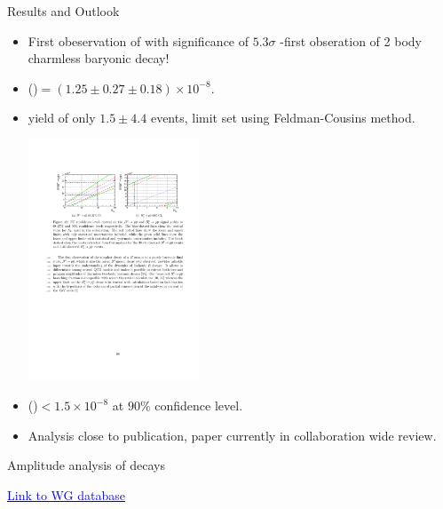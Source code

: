 \documentclass{beamer}
\begin{document}
\begin{frame}{Results and Outlook}
  \begin{itemize}
  \item First obeservation of \decay{\Bd}{\proton \antiproton} with significance of $5.3\sigma$ -first obseration of 2 body charmless baryonic \Bd decay!
  \item \BF(\decay{\Bd}{\proton \antiproton})$ = (1.25\pm0.27\pm0.18) \times 10^{-8}$.
  \item \decay{\Bs}{\proton \antiproton} yield of only $1.5\pm4.4$ events, limit set using Feldman-Cousins method.
    \begin{center}
      \includegraphics[width=0.4\textwidth]{PPBarFC.pdf}
    \end{center}
  \item \BF(\decay{\Bs}{\proton \antiproton})$ < 1.5 \times 10^{-8} $ at $90\%$ confidence level.
  \item Analysis close to publication, paper currently in collaboration wide review.
  \end{itemize}
\end{frame}

\begin{frame}
  \begin{block}{}
    \centering Amplitude analysis of \Large \decay{\Bd}{(\pip \pim)(\Kp\pim)} decays
  \end{block}
  \centering \href{https://lhcb-wg.web.cern.ch/lhcb-WG/bnoc/listentry.py?name=2011\%2B12+B+-\%3E+K\%2A0+rho0+BF\&cat=analysis}{\textcolor{blue}{Link to WG database}}
\end{frame}
\end{document}
